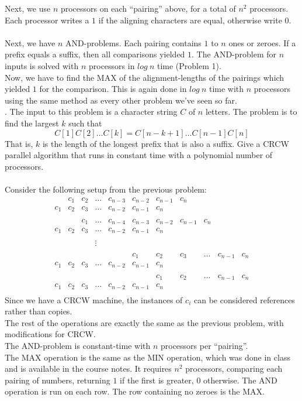 \documentclass[10pt]{article}
\begin{document}
Next, we use $n$ processors on each ``pairing'' above, for a total of $n^2$ processors. Each processor writes
a $1$ if the aligning characters are equal, otherwise write $0$.\\
\\
Next, we have $n$ AND-problems. Each pairing contains $1$ to $n$ ones or zeroes. If a prefix equals a suffix,
then all comparisons yielded $1$. The AND-problem for $n$ inputs is solved with $n$ processors in $log~n$ time (Problem 1).
\\
Now, we have to find the MAX of the alignment-lengths of the pairings which yielded $1$ for the comparison. This is again
done in $log~n$ time with $n$ processors using the same method as every other problem we've seen so far.\\


. The input to this problem is a character string $C$ of $n$ letters. The problem is to find the largest $k$
such that
\[C[1]C[2] \ldots C[k] = C[n - k + 1] \ldots C[n - 1]C[n]\]
That is, $k$ is the length of the longest prefix that is also a suffix. Give a CRCW parallel algorithm that
runs in constant time with a polynomial number of processors.\\
\\
Consider the following setup from the previous problem:\\
\[
\begin{array}{ccccccccccccc}
    & c_1 & c_2 & \ldots & c_{n-3} & c_{n-2} & c_{n-1} & c_n \\
c_1 & c_2 & c_3 & \ldots & c_{n-2} & c_{n-1} & c_n \\
\\
    &     & c_1 & \ldots & c_{n-4} & c_{n-3} & c_{n-2} & c_{n-1} & c_n \\
c_1 & c_2 & c_3 & \ldots & c_{n-2} & c_{n-1} & c_n \\
\\
    &     &     & \vdots &         &         &     \\
\\
    &     &     &        &         & c_1     & c_2 & c_3 & \ldots & c_{n-1} & c_n \\
c_1 & c_2 & c_3 & \ldots & c_{n-2} & c_{n-1} & c_n \\
\\
    &     &     &        &         &         & c_1 & c_2 & \ldots & c_{n-1} & c_n \\
c_1 & c_2 & c_3 & \ldots & c_{n-2} & c_{n-1} & c_n \\
\end{array}
\]
Since we have a CRCW machine, the instances of $c_i$ can be considered references rather than copies.\\
The rest of the operations are exactly the same as the previous problem, with modifications for CRCW.\\
The AND-problem is constant-time with $n$ processors per ``pairing''.\\
The MAX operation is the same as the MIN operation, which was done in class and is available in the course notes.
It requires $n^2$ processors, comparing each pairing of numbers, returning $1$ if the first is greater, $0$ otherwise.
The AND operation is run on each row. The row containing no zeroes is the MAX.
\end{document}
